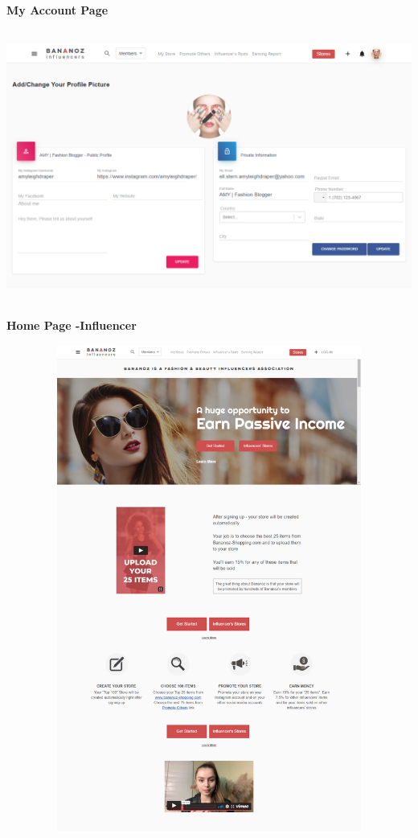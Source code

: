 \textbf{My Account Page}
\begin{center}
\includegraphics[height=9cm,width=14cm]{Admin/my-account.png}
\end{center}

\pagebreak



\textbf{Home Page -Influencer}
\begin{center}
\includegraphics[height=16cm,width=14cm]{Admin/home-influencer.png}
\end{center}
\pagebreak

